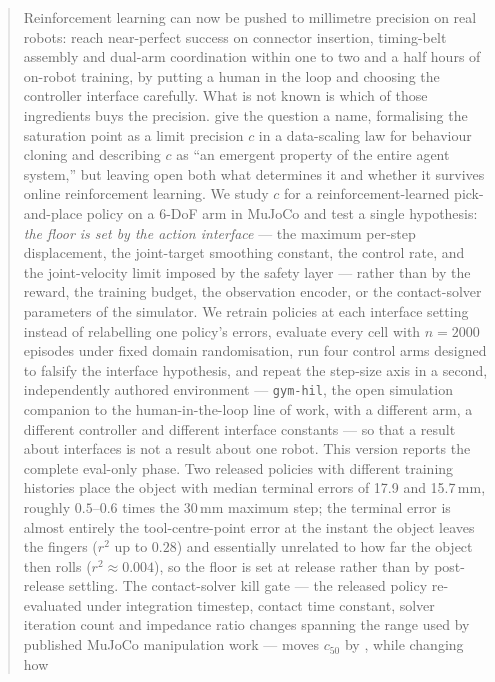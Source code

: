 \documentclass{article}
\begin{document}
\begin{abstract}
Reinforcement learning can now be pushed to millimetre precision on real
robots: \citet{luo2025hilserl} reach near-perfect success on connector
insertion, timing-belt assembly and dual-arm coordination within one to two
and a half hours of on-robot training, by putting a human in the loop and
choosing the controller interface carefully. What is not known is which of
those ingredients buys the precision. \citet{xu2026curse} give the question a
name, formalising the saturation point as a limit precision $c$ in a
data-scaling law for behaviour cloning and describing $c$ as ``an emergent
property of the entire agent system,'' but leaving open both what determines
it and whether it survives online reinforcement learning. We study $c$ for a reinforcement-learned pick-and-place policy on a
6-DoF arm in MuJoCo and test a single hypothesis: \emph{the floor is set by the
action interface} --- the maximum per-step displacement, the joint-target
smoothing constant, the control rate, and the joint-velocity limit imposed by
the safety layer --- rather than by the reward, the training budget, the
observation encoder, or the contact-solver parameters of the simulator. We
retrain policies at each interface setting instead of relabelling one policy's
errors, evaluate every cell with $n{=}2000$ episodes under fixed domain
randomisation, run four control arms designed to falsify the interface
hypothesis, and repeat the step-size axis in a second, independently authored
environment --- \texttt{gym-hil}, the open simulation companion to the
human-in-the-loop line of work, with a different arm, a different controller
and different interface constants --- so that a result about interfaces is not
a result about one robot. This version reports the complete eval-only phase. Two released
policies with different training histories place the object with median
terminal errors of 17.9 and 15.7\,mm, roughly $0.5$--$0.6$ times the 30\,mm
maximum step; the terminal error is almost entirely the tool-centre-point
error at the instant the object leaves the fingers ($r^2$ up to $0.28$) and
essentially unrelated to how far the object then rolls ($r^2 \approx 0.004$),
so the floor is set at release rather than by post-release settling. The
contact-solver kill gate --- the released policy re-evaluated under integration
timestep, contact time constant, solver iteration count and impedance ratio
changes spanning the range used by published MuJoCo manipulation work --- moves
$c_{50}$ by \unskip, while changing how

\end{abstract}
\end{document}
